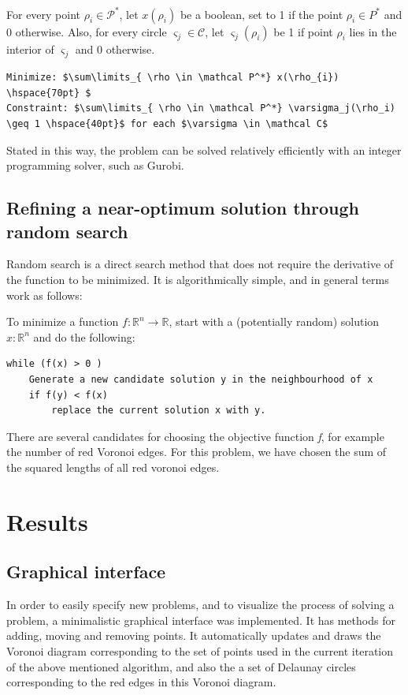 \documentclass[a4paper,12pt]{article}
\begin{document}
For every point $\rho_i \in \mathcal P^*$, let $x(\rho_i)$ be a boolean, set to 1 if the point $\rho_i \in P^*$  and 0 otherwise. Also, for every circle $\varsigma_j \in \mathcal C$, let $\varsigma_j (\rho_i)$ be 1 if point $\rho_i$ lies in the interior of $\varsigma_j$ and 0 otherwise.

\begin{lstlisting}[mathescape]
Minimize: $\sum\limits_{ \rho \in \mathcal P^*} x(\rho_{i}) \hspace{70pt} $
Constraint: $\sum\limits_{ \rho \in \mathcal P^*} \varsigma_j(\rho_i) \geq 1 \hspace{40pt}$ for each $\varsigma \in \mathcal C$
\end{lstlisting}

Stated in this way, the problem can be solved relatively efficiently with an integer programming solver, such as Gurobi.

\subsection{Refining a near-optimum solution through random search}
\label{sec:rand}
Random search is a direct search method that does not require the derivative of the function to be minimized. It is algorithmically simple, and in general terms work as follows:

To minimize a function $f : \mathds{R}^n \rightarrow \mathds{R}$, start with a (potentially random)  solution $x :  \mathds{R}^n$ and do the following:

\begin{lstlisting}[mathescape]
while (f(x) > 0 )
	Generate a new candidate solution y in the neighbourhood of x
	if f(y) < f(x)
		replace the current solution x with y.
\end{lstlisting}

There are several candidates for choosing the objective function \emph{f}, for example the number of red Voronoi edges. For this problem, we have chosen the sum of the squared lengths of all red voronoi edges.

\section{Results}

\subsection{Graphical interface}
In order to easily specify new problems, and to visualize the process of solving a problem, a minimalistic graphical interface was implemented. It has methods for adding, moving and removing points. It automatically updates and draws the Voronoi diagram corresponding to the set of points used in the current iteration of the above mentioned algorithm, and also the a set of Delaunay circles corresponding to the red edges in this Voronoi diagram.
\end{document}
